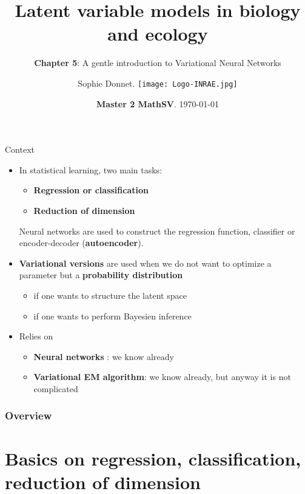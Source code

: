 \documentclass[compress,10pt]{beamer}
\title{Latent variable models in biology and ecology}%
\subtitle{\textbf{Chapter 5}: A gentle introduction to Variational Neural Networks}
\author{Sophie  Donnet.  \texttt{[image: Logo-INRAE.jpg]} }
\date{ \textbf{Master 2 MathSV}. \today}
\begin{document}
\frame{\titlepage}



\begin{frame}{Context}

\begin{itemize}
\item  In statistical learning, two main tasks:
\begin{itemize}
 
\item   \textbf{Regression or classification}
\item   \textbf{Reduction of dimension}
 
\end{itemize}
  Neural networks are used to construct the regression function,
  classifier or encoder-decoder (\textbf{autoencoder}).
\item
  \textbf{Variational versions} are used when we do not want to optimize
  a parameter but a \textbf{probability distribution}
\begin{itemize}
  \item
  if one wants to structure the latent space
\item
  if one wants to perform Bayesien inference
  \end{itemize}
  
\item
  Relies on
  \begin{itemize}
\item
  \textbf{Neural networks} : we know already
\item
  \textbf{Variational EM algorithm}: we know already, but anyway it is
  not complicated
   \end{itemize}
\end{itemize}
\end{frame}


\begin{frame}
\frametitle{Overview} 
\tableofcontents
\end{frame}



\section{Basics on regression, classification, reduction of dimension}
\end{document}
